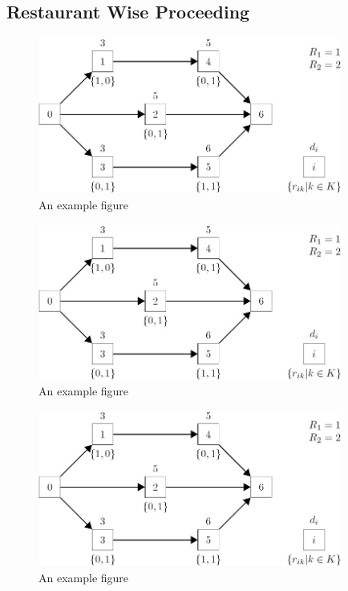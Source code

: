 \subsection{Restaurant Wise Proceeding}\label{subsection:Restaurant Wise Proceeding}
\begin{figure}[h]
\begin{center}
\includegraphics[width=10cm]{images/example_figure}
\caption{An example figure}
\label{fig:example}
\end{center}
\end{figure}
\begin{figure}[h]
\begin{center}
\includegraphics[width=10cm]{images/example_figure}
\caption{An example figure}
\label{fig:example}
\end{center}
\end{figure}
\begin{figure}[h]
\begin{center}
\includegraphics[width=10cm]{images/example_figure}
\caption{An example figure}
\label{fig:example}
\end{center}
\end{figure}
